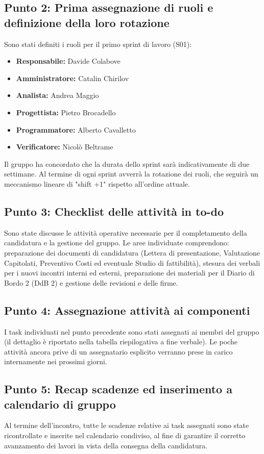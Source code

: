 \documentclass[a4paper, 11pt]{article}
\begin{document}
\subsection{Punto 2: Prima assegnazione di ruoli e definizione della loro rotazione}
Sono stati definiti i ruoli per il primo sprint di lavoro (S01):
\begin{itemize}
    \item \textbf{Responsabile:} Davide Colabove
    \item \textbf{Amministratore:} Catalin Chirilov
    \item \textbf{Analista:} Andrea Maggio
    \item \textbf{Progettista:} Pietro Brocadello
    \item \textbf{Programmatore:} Alberto Cavalletto
    \item \textbf{Verificatore:} Nicolò Beltrame
\end{itemize}
Il gruppo ha concordato che la durata dello sprint sarà indicativamente di due settimane. Al termine di ogni sprint avverrà la rotazione dei ruoli, che seguirà un meccanismo lineare di "shift +1" rispetto all'ordine attuale.

\subsection{Punto 3: Checklist delle attività in to-do}
Sono state discusse le attività operative necessarie per il completamento della candidatura e la gestione del gruppo. Le aree individuate comprendono: preparazione dei documenti di candidatura (Lettera di presentazione, Valutazione Capitolati, Preventivo Costi ed eventuale Studio di fattibilità), stesura dei verbali per i nuovi incontri interni ed esterni, preparazione dei materiali per il Diario di Bordo 2 (DdB 2) e gestione delle revisioni e delle firme.

\subsection{Punto 4: Assegnazione attività ai componenti}
I task individuati nel punto precedente sono stati assegnati ai membri del gruppo (il dettaglio è riportato nella tabella riepilogativa a fine verbale). Le poche attività ancora prive di un assegnatario esplicito verranno prese in carico internamente nei prossimi giorni.

\subsection{Punto 5: Recap scadenze ed inserimento a calendario di gruppo}
Al termine dell'incontro, tutte le scadenze relative ai task assegnati sono state ricontrollate e inserite nel calendario condiviso, al fine di garantire il corretto avanzamento dei lavori in vista della consegna della candidatura.
\end{document}
